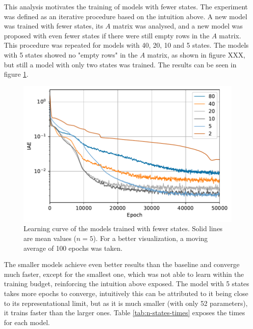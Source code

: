 This analysis motivates the training of models with fewer states.
The experiment was defined as an iterative procedure based on the intuition above.
A new model was trained with fewer states, its $A$ matrix was analysed, and a new model was proposed with even fewer states if there were still empty rows in the $A$ matrix.
This procedure was repeated for models with 40, 20, 10 and 5 states.
The models with 5 states showed no "empty rows" in the $A$ matrix, as shown in figure XXX, but still a model with only two states was trained.  %
The results can be seen in figure \ref{fig:states-iae}.

\begin{figure}[h]
    \centering
    \includegraphics{images/exp_2_iae.pdf}
    \caption{Learning curve of the models trained with fewer states. Solid lines are mean values ($n=5$). For a better visualization, a moving average of 100 epochs was taken.}
    \label{fig:states-iae}
\end{figure}

The smaller models achieve even better results than the baseline and converge much faster, except for the smallest one, which was not able to learn within the training budget, reinforcing the intuition above exposed.
The model with 5 states takes more epochs to converge, intuitively this can be attributed to it being close to its representational limit, but as it is much smaller (with only 52 parameters), it trains faster than the larger ones.
Table \ref{tab:n-states-times} exposes the times for each model.


